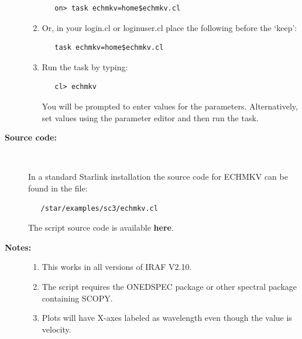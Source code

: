 \documentclass[twoside,11pt]{article}
\newcommand{\htmlref}[2]{#1}
\begin{document}
\begin{description}
\begin{enumerate}
\begin{verbatim}
   on> task echmkv=home$echmkv.cl
\end{verbatim}

\item Or, in your login.cl or loginuser.cl place the following
      before the `keep':

\begin{verbatim}
   task echmkv=home$echmkv.cl
\end{verbatim}

\item Run the task by typing:

\begin{verbatim}
   cl> echmkv
\end{verbatim}

      You will be prompted
      to enter values for the parameters. Alternatively, set values
      using the parameter editor and then run the task.
\end{enumerate}

\item [{\bf Source code:}] \mbox{} \\
\begin{latex}
In a standard Starlink installation the source code for ECHMKV can be found
in the file:
\begin{verbatim}
   /star/examples/sc3/echmkv.cl
\end{verbatim}
\end{latex}
\begin{htmlonly}
      The script source code is available
      \htmlref{{\bf here}}{se_echmkv_source}.
\end{htmlonly}

\item [{\bf Notes:}] \mbox{}
\begin{enumerate}
\item This works in all versions of IRAF V2.10.

\item The script requires the ONEDSPEC package or other spectral
      package containing SCOPY.

\item Plots will have X-axes labeled as wavelength even though the
      value is velocity.
\end{enumerate}

\end{description}

\newpage
\end{document}
